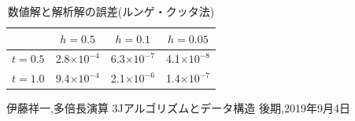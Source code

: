 \documentclass[dvipdfmx]{jarticle}
\begin{document}
  \begin{table}[H]
    \caption{数値解と解析解の誤差(ルンゲ・クッタ法)}
  \label{RKgosal}
  \begin{center}
      \begin{tabular}{c|c|c|c}\hline 
        & $h=0.5$ & $h=0.1$ & $h=0.05$ \\ \hline \hline 
        $t=0.5$ & 2.8$\times10^{-4}$ & 6.3$\times10^{-7}$ & 4.1$\times10^{-8}$ \\ 
        $t=1.0$ & 9.4$\times10^{-4}$ & 2.1$\times10^{-6}$ & 1.4$\times10^{-7}$ \\ \hline
      \end{tabular}
  \end{center}
  \end{table}    







        \begin{thebibliography}{9}
            伊藤祥一,多倍長演算 3Jアルゴリズムとデータ構造 後期,2019年9月4日
          \end{thebibliography}
\end{document}
